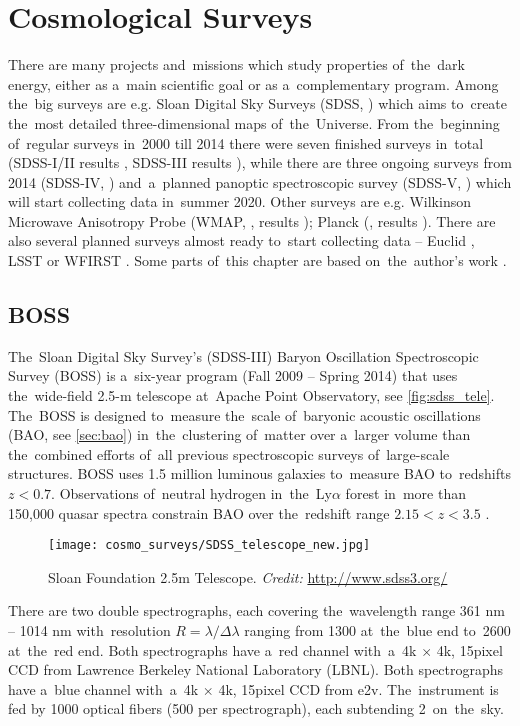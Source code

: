 \chapter{Cosmological Surveys}
\label{chpt:cosmo_surveys}
There are many projects and~missions which study properties of~the~dark energy, either as a~main scientific goal or as a~complementary program. Among the~big surveys are e.g. Sloan Digital Sky Surveys (SDSS, \cite{SDSS}) which aims to~create the~most detailed three-dimensional maps of~the~Universe. From the~beginning of~regular surveys in~2000 till 2014 there were seven finished surveys in~total (SDSS-I/II results \cite{SDSS_I_II}, SDSS-III results \cite{BOSS_results}), while there are three ongoing surveys from 2014 (SDSS-IV, \cite{2017AJ....154...28B}) and~a~planned panoptic spectroscopic survey (SDSS-V, \cite{2017arXiv171103234K}) which will start collecting data in~summer 2020. Other surveys are e.g. Wilkinson Microwave Anisotropy Probe (WMAP, \cite{WMAP}, results \cite{WMAP_results}); Planck (\cite{planck}, results \cite{planck_cosm}). There are also several planned surveys almost ready to~start collecting data -- Euclid \parencite{euclid}, LSST \parencite{lsst} or WFIRST \parencite{WFIRST_report}. Some parts of~this chapter are based on~the~author's work \textcite{mastersthesis_vrastil}.
\section{BOSS}
The~Sloan Digital Sky Survey's (SDSS-III) Baryon Oscillation Spectroscopic Survey (BOSS) is a~six-year program (Fall 2009 -- Spring 2014)  that uses the~wide-field 2.5-m telescope at~Apache Point Observatory, see \autoref{fig:sdss_tele}. The~BOSS is designed to~measure the~scale of~baryonic acoustic oscillations (BAO, see \autoref{sec:bao}) in~the~clustering of~matter over a~larger volume than the~combined efforts of~all previous spectroscopic surveys of~large-scale structures. BOSS uses 1.5 million luminous galaxies to~measure BAO to~redshifts $z<0.7$. Observations of~neutral hydrogen in~the~Ly$\alpha$ forest in~more than 150,000 quasar spectra constrain BAO over the~redshift range $2.15 < z < 3.5$ \cite{BOSS}.
\begin{figure}[tb]
    \centering
    \texttt{[image: cosmo\_surveys/SDSS\_telescope\_new.jpg]}
    \caption{Sloan Foundation 2.5m Telescope. \textit{Credit:} \url{http://www.sdss3.org/}}
    \label{fig:sdss_tele}
\end{figure}

There are two double spectrographs, each covering the~wavelength range 361 nm -- 1014 nm with~resolution $R=\lambda/\Delta\lambda$ ranging from 1300 at~the~blue end to~2600 at~the~red end.  Both spectrographs have a~red channel with~a~4k $\times$ 4k, 15\um  pixel CCD from Lawrence Berkeley National Laboratory (LBNL). Both spectrographs have a~blue channel with~a~4k $\times$ 4k, 15\um  pixel CCD from  e2v. The~instrument is fed by 1000 optical fibers (500 per spectrograph), each subtending 2\arcsec\ on~the~sky.

